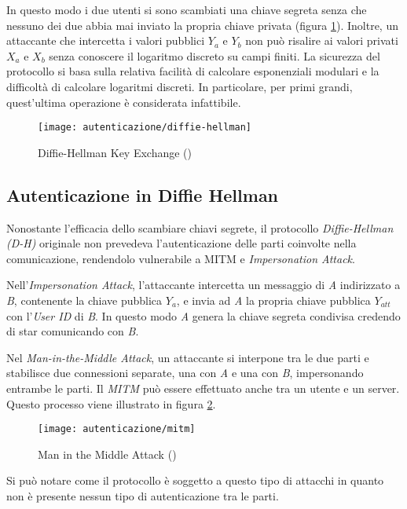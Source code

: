 In questo modo i due utenti si sono scambiati una chiave segreta senza che nessuno dei due abbia mai inviato la propria chiave privata (figura \ref{fig:diffie-hellman}).
Inoltre, un attaccante che intercetta i valori pubblici $Y_a$ e $Y_b$ non può risalire ai valori privati $X_a$ e $X_b$ senza conoscere il logaritmo discreto su campi finiti.
La sicurezza del protocollo si basa sulla relativa facilità di calcolare esponenziali modulari e la difficoltà di calcolare logaritmi discreti. In particolare, per primi grandi, quest'ultima operazione è considerata infattibile.

\begin{figure}[!ht] 
    \centering 
    \texttt{[image: autenticazione/diffie-hellman]} 
    \caption{Diffie-Hellman Key Exchange (\cite{site:diffie-hellman-image})}
	\label{fig:diffie-hellman}
\end{figure}


\subsection{Autenticazione in Diffie Hellman}
Nonostante l'efficacia dello scambiare chiavi segrete, il protocollo \emph{Diffie-Hellman (D-H)} originale non prevedeva l'autenticazione delle parti coinvolte nella comunicazione, rendendolo vulnerabile a MITM e \emph{\gls{Impersonation Attack}}.

Nell'\emph{Impersonation Attack}, l'attaccante intercetta un messaggio di \emph{A} indirizzato a \emph{B}, contenente la chiave pubblica $Y_a$, e invia ad \emph{A} la propria chiave pubblica $Y_{att}$ con l'\emph{User ID} di \emph{B}.
In questo modo \emph{A} genera la chiave segreta condivisa credendo di star comunicando con \emph{B}.

Nel \emph{Man-in-the-Middle Attack}, un attaccante si interpone tra le due parti e stabilisce due connessioni separate, una con \emph{A} e una con \emph{B}, impersonando entrambe le parti. Il \emph{MITM} può essere effettuato anche tra un utente e un server. Questo processo viene illustrato in figura \ref{fig:mitm}.

\begin{figure}[!ht] 
    \centering 
    \texttt{[image: autenticazione/mitm]} 
    \caption{Man in the Middle Attack (\cite{site:mitm-image})}
	\label{fig:mitm}
\end{figure}

Si può notare come il protocollo è soggetto a questo tipo di attacchi in quanto non è presente nessun tipo di autenticazione tra le parti.

